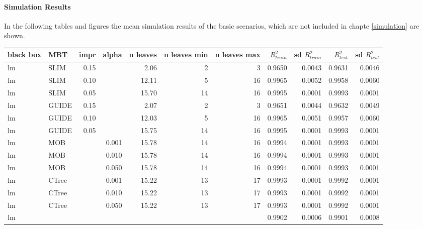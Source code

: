 \paragraph{Simulation Results}
In the following tables and figures the mean simulation results of the basic scenarios, which are not included in chapte \ref{simulation} are shown.
\begin{table}[!htb]
\centering \tiny
\begin{tabular}[t]{l|l|r|r|r|r|r|r|r|r|r}
\hline
black box & MBT & impr & alpha & n leaves & n leaves min & n leaves max &  $R^2_{train}$ & sd $R^2_{train}$ & $R^2_{test}$ & sd $R^2_{test}$\\
\hline
lm & SLIM & 0.15 & & 2.06 & 2 & 3 & 0.9650 & 0.0043 & 0.9631 & 0.0046\\
lm & SLIM & 0.10 & & 12.11 & 5 & 16 & 0.9965 & 0.0052 & 0.9958 & 0.0060\\
lm & SLIM & 0.05 & & 15.70 & 14 & 16 & 0.9995 & 0.0001 & 0.9993 & 0.0001\\
lm & GUIDE & 0.15 & & 2.07 & 2 & 3 & 0.9651 & 0.0044 & 0.9632 & 0.0049\\
lm & GUIDE & 0.10 & & 12.03 & 5 & 16 & 0.9965 & 0.0051 & 0.9957 & 0.0060\\
lm & GUIDE & 0.05 & & 15.75 & 14 & 16 & 0.9995 & 0.0001 & 0.9993 & 0.0001\\
lm & MOB & & 0.001 & 15.78 & 14 & 16 & 0.9994 & 0.0001 & 0.9993 & 0.0001\\
lm & MOB & & 0.010 & 15.78 & 14 & 16 & 0.9994 & 0.0001 & 0.9993 & 0.0001\\
lm & MOB & & 0.050 & 15.78 & 14 & 16 & 0.9994 & 0.0001 & 0.9993 & 0.0001\\
lm & CTree & & 0.001 & 15.22 & 13 & 17 & 0.9993 & 0.0001 & 0.9992 & 0.0001\\
lm & CTree & & 0.010 & 15.22 & 13 & 17 & 0.9993 & 0.0001 & 0.9992 & 0.0001\\
lm & CTree & & 0.050 & 15.22 & 13 & 17 & 0.9993 & 0.0001 & 0.9992 & 0.0001\\
\hline
lm &  & & & & &  & 0.9902 & 0.0006 & 0.9901 & 0.0008\\
\hline


\end{tabular}
\end{table}
